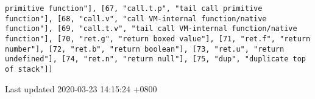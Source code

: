 \begin{verbatim}
primitive function"], [67, "call.t.p", "tail call primitive function"], [68, "call.v", "call VM-internal function/native function"], [69, "call.t.v", "tail call VM-internal function/native function"], [70, "ret.g", "return boxed value"], [71, "ret.f", "return number"], [72, "ret.b", "return boolean"], [73, "ret.u", "return undefined"], [74, "ret.n", "return null"], [75, "dup", "duplicate top of stack"]]
\end{verbatim}

\label{org8222156}

\label{orgc2bb649}
Last updated 2020-03-23 14:15:24 +0800
